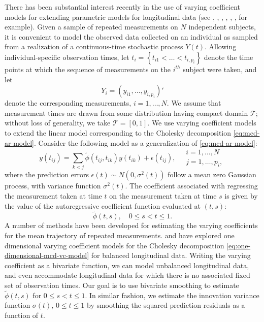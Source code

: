 There has been substantial interest recently in the use of varying coefficient models for extending parametric models for longitudinal data (see \cite{noh2010sparse}, \cite{csenturk2013modeling}, \cite{csenturk2008generalized}, \cite{chiang2001smoothing}, \cite{hoover1998nonparametric}, \cite{fan1999statistical}, for example). Given a sample of repeated measurements on $N$ independent subjects, it is convenient to model the observed data collected on an individual as sampled from a realization of a continuous-time stochastic process $Y\left(t\right)$. Allowing individual-specific observation times, let $t_{i} = \left\{t_{i1} <  \dots < t_{i,p_i}\right\}$ denote the time points at which the sequence of measurements on the $i^{th}$ subject were taken, and let
\[
Y_i = \left(y_{i1}, \dots, y_{i,p_i}\right)'
\]
\noindent
denote the corresponding measurements, $i = 1, \dots, N$. We assume that measurement times are drawn from some distribution having compact domain $\mathcal{T}$; without loss of generality, we take $\mathcal{T} = \left[0,1\right]$. We use varying coefficient models to extend the linear model corresponding to the Cholesky decomposition \eqref{eq:mcd-ar-model}. Consider the following model as a generalization of \eqref{eq:mcd-ar-model}: 
\begin{equation}  \label{eq:cholesky-regression-model-1} 
y\left(t_{ij} \right)  = \sum_{k < j} \tilde{\phi}\left(t_{ij} ,t_{ik}\right) y\left(t_{ik}\right) + \epsilon\left({t_{ij}}\right), \quad \begin{array}{l} i = 1, \dots, N\\ j = 1, \dots, p_i,\end{array}
\end{equation}
\noindent
where the prediction errors $\epsilon\left(t\right) \sim N\left(0, \sigma^2\left(t\right)\right)$ follow a mean zero Gaussian process, with variance function $\sigma^2\left(t\right)$. The coefficient associated with regressing the measurement taken at time $t$ on the measurement taken at time $s$ is given by the value of the autoregressive coefficient function evaluated at $\left(t,s\right)$:
\[
\tilde{\phi}\left(t,s\right), \quad 0 \le s < t \le 1.
\]
A number of methods have been developed for estimating the varying coefficients for the mean trajectory of repeated measurements. \cite{wu2003nonparametric} and \cite{dahlhaus1997fitting} have explored one dimensional varying coefficient models for the Cholesky decomposition \eqref{eq:one-dimensional-mcd-vc-model} for balanced longitudinal data. Writing the varying coefficient as a bivariate function, we can model unbalanced longitudinal data, and even accommodate longitudinal data for which there is no associated fixed set of observation times. Our goal is to use bivariate smoothing to estimate $\tilde{\phi}\left(t,s\right)$ for $0 \le s < t \le 1$. In similar fashion, we estimate the innovation variance function $\sigma\left(t \right)$, $0 \le t \le 1$ by smoothing the squared prediction residuals as a function of $t$. 

